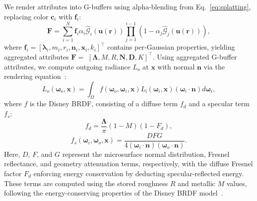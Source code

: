 We render attributes into G-buffers using alpha-blending from Eq.~\ref{eq:splatting}, replacing color $\boldsymbol{c}_i$ with $\boldsymbol{f}_i$:
\begin{equation}
\label{eq:splatting-feas}
\boldsymbol{F}=\sum_{i=1}^N \boldsymbol{f}_i \alpha_i \hat{\mathcal{G}}_i(\boldsymbol{u}(\boldsymbol{r})) \prod_{j=1}^{i-1}\left(1-\alpha_j \hat{\mathcal{G}}_j(\boldsymbol{u}(\boldsymbol{r}))\right),
\end{equation}
where $\boldsymbol{f}_i=\left[\boldsymbol{\lambda}_i, m_i, r_i, \boldsymbol{n}_i, \boldsymbol{x}_i, k_i\right]^{\top}$ contains per-Gaussian properties, yielding aggregated attributes $\boldsymbol{F}=$ $[\boldsymbol{\Lambda}, M, R, \boldsymbol{N}, \boldsymbol{D}, K]^{\top}$. 
Using aggregated G-buffer attributes, we compute outgoing radiance $L_o$ at $\boldsymbol{x}$ with normal $\boldsymbol{n}$ via the rendering equation~\cite{Kajiya_1998}:
\begin{equation}
L_o\left(\boldsymbol{\omega}_o, \boldsymbol{x}\right) = \int_{\Omega} f\left(\boldsymbol{\omega}_o, \boldsymbol{\omega}_i, \boldsymbol{x}\right) L_{\mathrm{i}}\left(\boldsymbol{\omega}_i, \boldsymbol{x}\right) (\boldsymbol{\omega}_i \cdot \boldsymbol{n})  d \boldsymbol{\omega}_i,
\label{eq:renderingEquation}
\end{equation}
where $f$ is the Disney BRDF, consisting of a diffuse term $f_d$
and a specular term $f_s$:
\begin{equation}
f_d = \frac{\boldsymbol{\Lambda}}{\pi}(1 - M)(1 - F_d),
\end{equation}
\begin{equation}
f_s\left(\boldsymbol{\omega}_i, \boldsymbol{\omega}_o, \boldsymbol{x}\right) = \frac{DFG}{4\left(\boldsymbol{\omega}_i \cdot \boldsymbol{n}\right)\left(\boldsymbol{\omega}_o \cdot \boldsymbol{n}\right)}.
\label{eq:disney_spec}
\end{equation}
Here, $D$, $F$, and $G$ represent the microsurface normal distribution, Fresnel reflectance, and geometry attenuation terms, respectively, with the diffuse Fresnel factor $F_d$ enforcing energy conservation by deducting specular-reflected energy. These terms are computed using the stored roughness $R$ and metallic $M$ values, following the energy-conserving properties of the Disney BRDF model~\cite{burley2012physically}.
